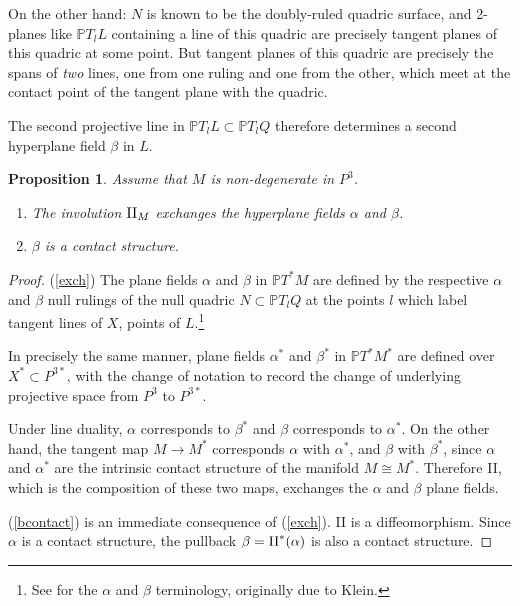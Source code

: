 \documentclass[11pt]{article}
\numberwithin{equation}{section}
\newcounter{count}
\theoremstyle{plain}
\newtheorem{proposition}[count]{Proposition}
\theoremstyle{remark}
\renewcommand{\P}{\mathbb{P}}
\newcommand{\II}{\textnormal{II}}
\begin{document}
On the other hand: $N$ is known to be the doubly-ruled quadric surface, and 2-planes like $\P T_l L$ containing a line of this quadric are precisely tangent planes of this quadric at some point. But tangent planes of this quadric are precisely the spans of \emph{two} lines, one from one ruling and one from the other, which meet at the contact point of the tangent plane with the quadric.

The second projective line in $\P T_l L\subset \P T_l Q$ therefore determines a second hyperplane field $\beta$ in $L$.

\begin{proposition} Assume that $M$ is non-degenerate in $P^3$.
\begin{enumerate}
\itemsep0em 
\item{\label{exch}The involution $\II_M$ exchanges the hyperplane fields $\alpha$ and $\beta$.}
\item{\label{bcontact}$\beta$ is a contact structure.}
\end{enumerate}
\end{proposition}

\begin{proof} (\ref{exch}) The plane fields $\alpha$ and $\beta$ in $\P T^*M$ are defined by the respective $\alpha$ and $\beta$ null rulings of the null quadric $N\subset \P T_l Q$ at the points $l$ which label tangent lines of $X$, points of $L$.\footnote{See \cite{ww} for the $\alpha$ and $\beta$ terminology, originally due to Klein.}

In precisely the same manner, plane fields $\alpha^*$ and $\beta^*$ in $\P T^*M^*$ are defined over $X^*\subset P^{3*}$, with the change of notation to record the change of underlying projective space from $P^3$ to $P^{3*}$. 

Under line duality, $\alpha$ corresponds to $\beta^*$ and $\beta$ corresponds to $\alpha^*$. On the other hand, the tangent map $M\rightarrow  M^*$ corresponds $\alpha$ with $\alpha^*$, and $\beta$ with $\beta^*$, since $\alpha$ and $\alpha^*$ are the intrinsic contact structure of the manifold $M\cong M^*$. Therefore II, which is the composition of these two maps, exchanges the $\alpha$ and $\beta$ plane fields.

(\ref{bcontact}) is an immediate consequence of (\ref{exch}). II is a diffeomorphism. Since $\alpha$ is a contact structure, the pullback $\beta = \II^*(\alpha)$ is also a contact structure.

\end{proof}
\end{document}
